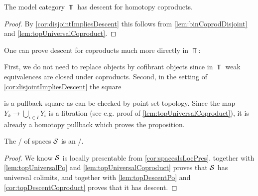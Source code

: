 \begin{corollary}\label{cor:topDescentCoproduct}
    The model category $\Top$ has descent for homotopy coproducts.
    \begin{proof}
        By \cref{cor:disjointImpliesDescent} this follows from \cref{lem:binCoprodDisjoint} and \cref{lem:topUniversalCoproduct}.
    \end{proof}
\end{corollary}
\begin{remark}
    One can prove descent for coproducts much more directly in $\Top$:

    First, we do not need to replace objects by cofibrant objects since in $\Top$ weak equivalences are closed under coproducts.
    Second, in the setting of \cref{cor:disjointImpliesDescent} the square
    \begin{center}
    \end{center}
    is a pullback square as can be checked by point set topology.
    Since the map $Y_k\to\bigcup\limits_{i\in I}Y_i$ is a fibration (see e.g. proof of \cref{lem:topUniversalCoproduct}), it is already a homotopy pullback which proves the proposition.
\end{remark}
\begin{corollary}
    The \inftycat/ of spaces $\mathcal{S}$ is an \inftytop/.
    \begin{proof}
        We know $\mathcal{S}$ is locally presentable from \cref{cor:spacesIsLocPres}.
         together with \cref{lem:topUniversalPo} and \cref{lem:topUniversalCoproduct} proves that $\mathcal{S}$ has universal colimits, and together with \cref{lem:topDescentPo} and \cref{cor:topDescentCoproduct} proves that it has descent.
    \end{proof}
\end{corollary}